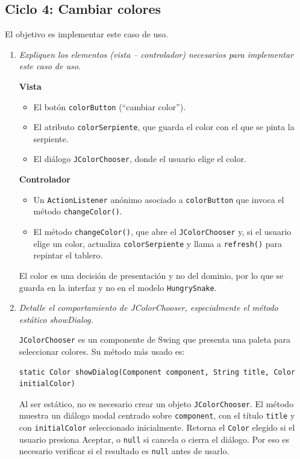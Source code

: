 \documentclass[12pt,letterpaper]{article}
\newcommand{\enunciado}[1]{\textit{#1}\par}
\begin{document}
\subsection{Ciclo 4: Cambiar colores}

El objetivo es implementar este caso de uso.

\begin{enumerate}
  \item \enunciado{Expliquen los elementos (vista -- controlador) necesarios para implementar este caso de uso.}

  \textbf{Vista}
  \begin{itemize}
    \item El botón \texttt{colorButton} (``cambiar color'').
    \item El atributo \texttt{colorSerpiente}, que guarda el color con el que se pinta la serpiente.
    \item El diálogo \texttt{JColorChooser}, donde el usuario elige el color.
  \end{itemize}

  \textbf{Controlador}
  \begin{itemize}
    \item Un \texttt{ActionListener} anónimo asociado a \texttt{colorButton} que invoca el método \texttt{changeColor()}.
    \item El método \texttt{changeColor()}, que abre el \texttt{JColorChooser} y, si el usuario elige un color, actualiza \texttt{colorSerpiente} y llama a \texttt{refresh()} para repintar el tablero.
  \end{itemize}

  El color es una decisión de presentación y no del dominio, por lo que se guarda en la interfaz y no en el modelo \texttt{HungrySnake}.

  \item \enunciado{Detalle el comportamiento de JColorChooser, especialmente el método estático showDialog.}

  \texttt{JColorChooser} es un componente de Swing que presenta una paleta para seleccionar colores. Su método más usado es:

\begin{lstlisting}
static Color showDialog(Component component, String title, Color initialColor)
\end{lstlisting}

  Al ser estático, no es necesario crear un objeto \texttt{JColorChooser}. El método muestra un diálogo modal centrado sobre \texttt{component}, con el título \texttt{title} y con \texttt{initialColor} seleccionado inicialmente. Retorna el \texttt{Color} elegido si el usuario presiona Aceptar, o \texttt{null} si cancela o cierra el diálogo. Por eso es necesario verificar si el resultado es \texttt{null} antes de usarlo.


\end{enumerate}
\end{document}
